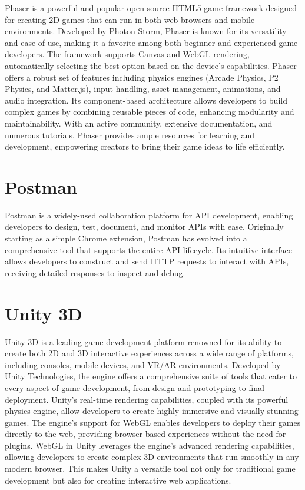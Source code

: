 Phaser is a powerful and popular open-source HTML5 game framework designed for creating 2D games that can run in both web browsers and mobile environments. Developed by Photon Storm, Phaser is known for its versatility and ease of use, making it a favorite among both beginner and experienced game developers. The framework supports Canvas and WebGL rendering, automatically selecting the best option based on the device's capabilities. Phaser offers a robust set of features including physics engines (Arcade Physics, P2 Physics, and Matter.js), input handling, asset management, animations, and audio integration. Its component-based architecture allows developers to build complex games by combining reusable pieces of code, enhancing modularity and maintainability. With an active community, extensive documentation, and numerous tutorials, Phaser provides ample resources for learning and development, empowering creators to bring their game ideas to life efficiently.
\section*{Postman}
Postman is a widely-used collaboration platform for API development, enabling developers to design, test, document, and monitor APIs with ease. Originally starting as a simple Chrome extension, Postman has evolved into a comprehensive tool that supports the entire API lifecycle. Its intuitive interface allows developers to construct and send HTTP requests to interact with APIs, receiving detailed responses to inspect and debug.

\section*{Unity 3D}
Unity 3D is a leading game development platform renowned for its ability to create both 2D and 3D interactive experiences across a wide range of platforms, including consoles, mobile devices, and VR/AR environments. Developed by Unity Technologies, the engine offers a comprehensive suite of tools that cater to every aspect of game development, from design and prototyping to final deployment.
Unity’s real-time rendering capabilities, coupled with its powerful physics engine, allow developers to create highly immersive and visually stunning games. The engine's support for WebGL enables developers to deploy their games directly to the web, providing browser-based experiences without the need for plugins. WebGL in Unity leverages the engine's advanced rendering capabilities, allowing developers to create complex 3D environments that run smoothly in any modern browser. This makes Unity a versatile tool not only for traditional game development but also for creating interactive web applications.
